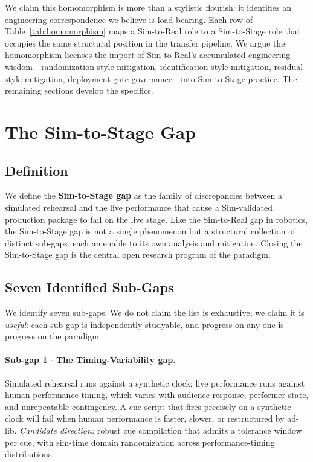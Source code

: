 \documentclass[11pt]{article}
\begin{document}
We claim this homomorphism is more than a stylistic flourish: it identifies
an engineering correspondence we believe is load-bearing.  Each row of
Table~\ref{tab:homomorphism} maps a Sim-to-Real role to a Sim-to-Stage role
that occupies the same structural position in the transfer pipeline.  We
argue the homomorphism licenses the import of Sim-to-Real's accumulated
engineering wisdom---randomization-style mitigation, identification-style
mitigation, residual-style mitigation, deployment-gate governance---into
Sim-to-Stage practice.  The remaining sections develop the specifics.

\section{The Sim-to-Stage Gap}
\label{sec:gap}

\subsection{Definition}

We define the \textbf{Sim-to-Stage gap} as the family of discrepancies
between a simulated rehearsal and the live performance that cause a
Sim-validated production package to fail on the live stage.  Like the
Sim-to-Real gap in robotics, the Sim-to-Stage gap is not a single
phenomenon but a structural collection of distinct sub-gaps, each amenable
to its own analysis and mitigation.  Closing the Sim-to-Stage gap is the
central open research program of the paradigm.

\subsection{Seven Identified Sub-Gaps}

We identify seven sub-gaps.  We do not claim the list is exhaustive; we
claim it is \emph{useful}: each sub-gap is independently studyable, and
progress on any one is progress on the paradigm.

\paragraph{Sub-gap 1 $\cdot$ The Timing-Variability gap.}
Simulated rehearsal runs against a synthetic clock; live performance runs
against human performance timing, which varies with audience response,
performer state, and unrepeatable contingency.  A cue script that fires
precisely on a synthetic clock will fail when human performance is faster,
slower, or restructured by ad-lib.  \textit{Candidate direction:} robust
cue compilation that admits a tolerance window per cue, with sim-time
domain randomization across performance-timing distributions.
\end{document}

